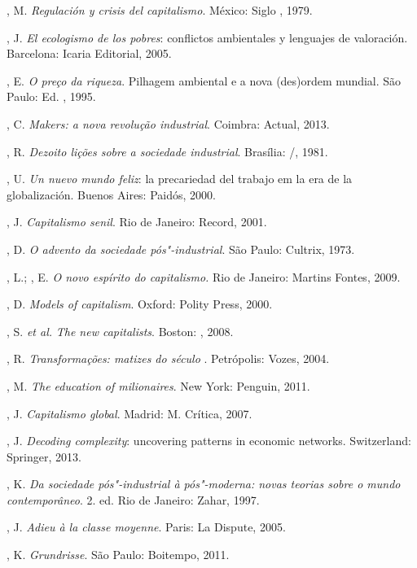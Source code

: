 \begin{Parskip}
, M. \emph{Regulación y crisis del capitalismo}. México: Siglo
, 1979.

, J. \emph{El ecologismo de los pobres}: conflictos ambientales y
lenguajes de valoración. Barcelona: Icaria Editorial, 2005.

, E. \emph{O preço da riqueza}. Pilhagem ambiental e a nova
(des)ordem mundial. São Paulo: Ed. , 1995.

, C. \emph{Makers: a nova revolução industrial}. Coimbra:
Actual, 2013.

, R. \emph{Dezoito lições sobre a sociedade industrial}. Brasília:
/, 1981.

, U. \emph{Un nuevo mundo feliz}: la precariedad del trabajo em la
era de la globalización. Buenos Aires: Paidós, 2000.

, J. \emph{Capitalismo senil}. Rio de Janeiro: Record, 2001.

, D. \emph{O advento da sociedade pós"-industrial}. São Paulo:
Cultrix, 1973.

, L.; , E. \emph{O novo espírito do capitalismo.}
Rio de Janeiro: Martins Fontes, 2009.

, D. \emph{Models of capitalism}. Oxford: Polity Press, 2000.

, S. \emph{et al.} \emph{The new capitalists}. Boston: ,
2008.

, R. \emph{Transformações: matizes do século }. Petrópolis:
Vozes, 2004.

, M. \emph{The education of milionaires}. New York: Penguin,
2011.

, J. \emph{Capitalismo global}. Madrid: M. Crítica, 2007.

, J. \emph{Decoding complexity}: uncovering patterns in
economic networks. Switzerland: Springer, 2013.

, K. \emph{Da sociedade pós"-industrial à pós"-moderna: novas
teorias sobre o mundo contemporâneo}. 2. ed. Rio de Janeiro: Zahar, 1997.

, J. \emph{Adieu à la classe moyenne}. Paris: La Dispute,
2005.

, K. \emph{Grundrisse}. São Paulo: Boitempo, 2011.


\end{Parskip}
